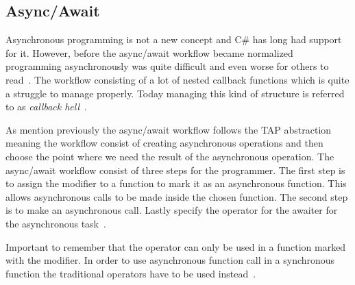 \subsection{Async/Await}
Asynchronous programming is not a new concept and C\# has long had support for it. However, before the async/await workflow became normalized programming asynchronously was quite difficult and even worse for others to read~\cite{DOC:TaskAsyncProgModel}. The workflow consisting of a lot of nested callback functions which is quite a struggle to manage properly. Today managing this kind of structure is referred to as \emph{callback hell}~\cites[p.~1-2]{PAPER:Callbackhell}[p~.2]{PAPER:PaxosCleipnir}. 

As mention previously the async/await workflow follows the TAP abstraction~\cite{DOC:TaskAsyncProgModel} meaning the workflow consist of creating asynchronous operations and then choose the point where we need the result of the asynchronous operation. The async/await workflow consist of three steps for the programmer. The first step is to assign the  modifier to a function to mark it as an asynchronous function. This allows asynchronous calls to be made inside the chosen function. The second step is to make an asynchronous call. Lastly specify the  operator for the awaiter for the asynchronous task~\cite{WEB:AsyncAwaitTut, DOC:AsyncAwait, VIDEO:AsyncConBack}.
 
Important to remember that the  operator can only be used in a function marked with the  modifier. In order to use asynchronous function call in a synchronous function the traditional operators have to be used instead~\cite{DOC:AsyncAwait, DOC:TaskAsyncProgModel}. 

